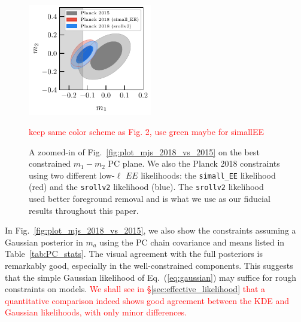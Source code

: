 \documentclass[prd,twocolumn,amsmath,amssymb,floatfix,superscriptaddress,nofootinbib]{revtex4-1}
\newcommand{\ch}[1]{\textcolor{red}{#1}}
\begin{document}
\begin{figure}
\includegraphics[width=0.48\textwidth]{plots/plot_m1_m2_t18_r12_t19_t20_vs_pl18_pc_zmax30_pliklite_0930_vs_pl18_pc_zmax30_pliklite_srollv2_1015.pdf}
\caption{A zoomed-in of Fig.~\ref{fig:plot_mjs_2018_vs_2015} on the best constrained $m_1-m_2$ PC plane. We also 
the Planck 2018 constraints using two different low-$\ell$ $EE$ likelihoods: the \texttt{simall\_EE} likelihood (red) and the \texttt{srollv2} likelihood (blue). The \texttt{srollv2} likelihood used better foreground removal and is what we use as our fiducial results throughout this paper. 
} \ch{keep same color scheme as Fig. 2, use green maybe for simallEE}
\label{fig:plot_m1m2_2015_vs_2018}
\end{figure}



In Fig.~\ref{fig:plot_mjs_2018_vs_2015}, we also show the constraints assuming a Gaussian posterior in $m_a$ using the PC chain covariance and means listed in Table~\ref{tab:PC_stats}.  The visual agreement with the full posteriors is remarkably good, especially in the well-constrained components.  This suggests that the simple Gaussian likelihood of Eq.~(\ref{eq:gaussian}) may suffice for rough constraints on models. \ch{We shall see in \S\ref{sec:effective_likelihood} that a quantitative comparison indeed shows good agreement between the KDE and Gaussian likelihoods, with only minor differences.}

\end{document}
